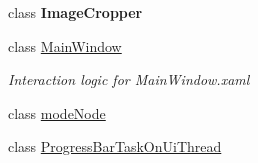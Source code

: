 \begin{DoxyCompactItemize}
class {\bfseries Image\+Cropper}
\item 
class \hyperlink{class_lu_animator_v2_1_1_main_window}{Main\+Window}
\begin{DoxyCompactList}\small\item\em Interaction logic for Main\+Window.\+xaml \end{DoxyCompactList}\item 
class \hyperlink{class_lu_animator_v2_1_1mode_node}{mode\+Node}
\item 
class \hyperlink{class_lu_animator_v2_1_1_progress_bar_task_on_ui_thread}{Progress\+Bar\+Task\+On\+Ui\+Thread}
\end{DoxyCompactItemize}

